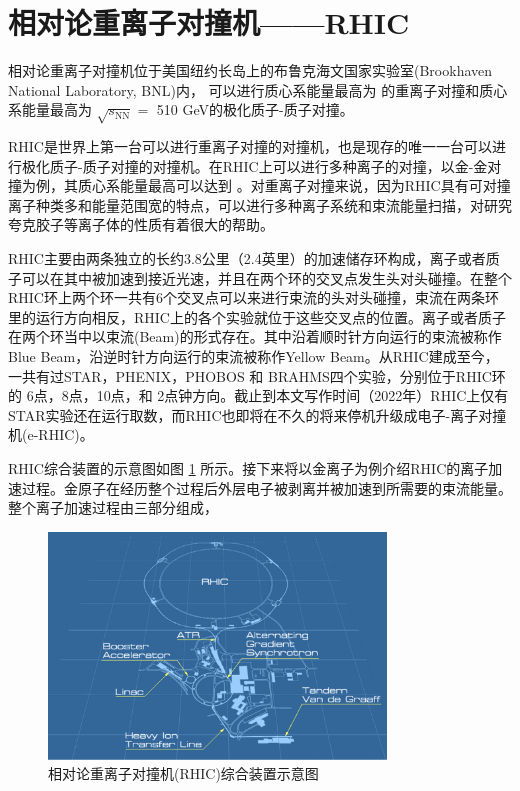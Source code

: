 \section{相对论重离子对撞机——RHIC}

相对论重离子对撞机位于美国纽约长岛上的布鲁克海文国家实验室(Brookhaven National Laboratory, BNL)内，
可以进行质心系能量最高为 \sNNerbai 的重离子对撞和质心系能量最高为 $\sqrt{s_{\mathrm{NN}}} = $ 510 GeV的极化质子-质子对撞。

RHIC是世界上第一台可以进行重离子对撞的对撞机，也是现存的唯一一台可以进行极化质子-质子对撞的对撞机。在RHIC上可以进行多种离子的对撞，以金-金对撞为例，其质心系能量最高可以达到 \sNNerbai 。对重离子对撞来说，因为RHIC具有可对撞离子种类多和能量范围宽的特点，可以进行多种离子系统和束流能量扫描，对研究夸克胶子等离子体的性质有着很大的帮助。

RHIC主要由两条独立的长约3.8公里（2.4英里）的加速储存环构成，离子或者质子可以在其中被加速到接近光速，并且在两个环的交叉点发生头对头碰撞。在整个RHIC环上两个环一共有6个交叉点可以来进行束流的头对头碰撞，束流在两条环里的运行方向相反，RHIC上的各个实验就位于这些交叉点的位置。离子或者质子在两个环当中以束流(Beam)的形式存在。其中沿着顺时针方向运行的束流被称作Blue Beam，沿逆时针方向运行的束流被称作Yellow Beam。从RHIC建成至今，一共有过STAR，PHENIX，PHOBOS 和 BRAHMS四个实验，分别位于RHIC环的 6点，8点，10点，和 2点钟方向。截止到本文写作时间（2022年）RHIC上仅有STAR实验还在运行取数，而RHIC也即将在不久的将来停机升级成电子-离子对撞机(e-RHIC)。

RHIC综合装置的示意图如图 \ref{fig:RHIC} 所示。接下来将以金离子为例介绍RHIC的离子加速过程。金原子在经历整个过程后外层电子被剥离并被加速到所需要的束流能量。整个离子加速过程由三部分组成，
\begin{figure}[htb]
    \begin{center}
    \includegraphics[width=0.8\textwidth,clip]{figures/Chapter2/RHIC.png}
    \end{center}
    \caption[相对论重离子对撞机(RHIC)综合装置示意图]{相对论重离子对撞机(RHIC)综合装置示意图}
    \label{fig:RHIC}
\end{figure}

